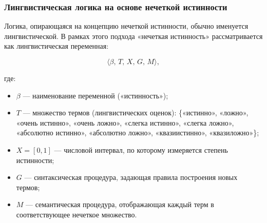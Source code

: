%
%
\subsubsection{Лингвистическая логика на основе нечеткой истинности}
\label{sec:linguistic_logic}

Логика, опирающаяся на концепцию нечеткой истинности, обычно именуется лингвистической\cite{ref40,ref43,ref44}. В рамках этого подхода «нечеткая истинность» рассматривается как лингвистическая переменная:

\[
\langle \beta,\,T,\,X,\,G,\,M\rangle,
\]

где:
\begin{itemize}
  \item $\beta$ — наименование переменной («истинность»);
  \item $T$ — множество термов (лингвистических оценок):
    \{«истинно», «ложно», «очень истинно», «очень ложно», «слегка истинно», «слегка ложно», «абсолютно истинно», «абсолютно ложно», «квазиистинно», «квазиложно»\};
  \item $X = [0,1]$ — числовой интервал, по которому измеряется степень истинности;
  \item $G$ — синтаксическая процедура, задающая правила построения новых термов;
  \item $M$ — семантическая процедура, отображающая каждый терм в соответствующее нечеткое множество.
\end{itemize}

